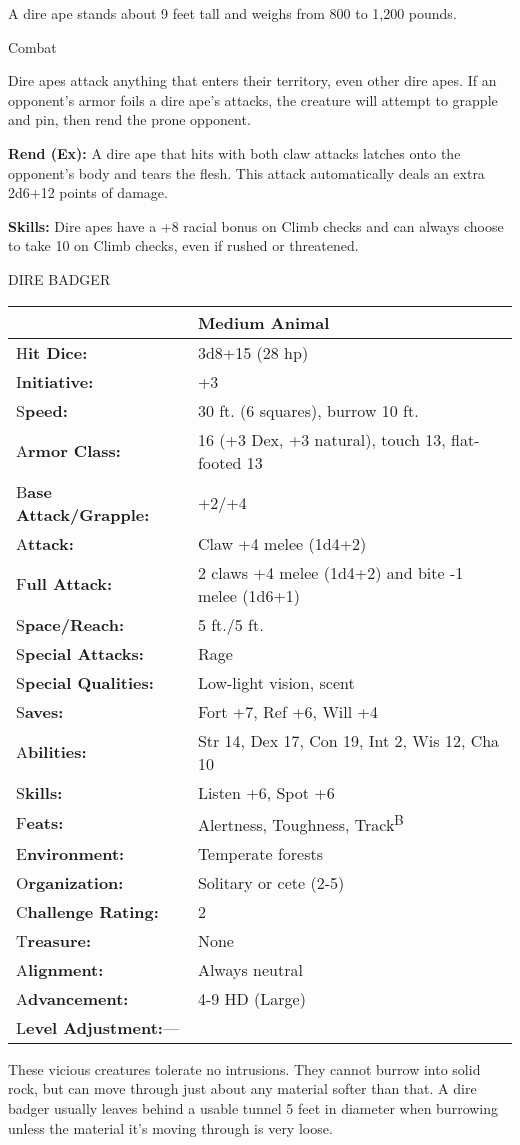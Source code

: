 \documentclass{article}
\begin{document}
A dire ape stands about 9 feet tall and weighs from 800 to 1,200 pounds.

Combat

Dire apes attack anything that enters their territory, even other dire apes. If 
an opponent's armor foils a dire ape's attacks, the creature will attempt to grapple 
and pin, then rend the prone opponent.

\textbf{Rend (Ex):} A dire ape that hits with both claw attacks latches onto the 
opponent's body and tears the flesh. This attack automatically deals an extra 2d6+12 
points of damage.

\textbf{Skills: }Dire apes have a +8 racial bonus on Climb checks and can always 
choose to take 10 on Climb checks, even if rushed or threatened.

\vspace{12pt}
DIRE BADGER

\begin{tabular}{|>{\raggedright}p{91pt}|>{\raggedright}p{211pt}|}
\hline
  & Medium Animal\tabularnewline
\hline
H\textbf{it Dice:} & 3d8+15 (28 hp)\tabularnewline
\hline
I\textbf{nitiative:} & +3\tabularnewline
\hline
S\textbf{peed:} & 30 ft. (6 squares), burrow 10 ft.\tabularnewline
\hline
A\textbf{rmor Class:} & 16 (+3 Dex, +3 natural), touch 13, flat-footed 13\tabularnewline
\hline
B\textbf{ase Attack/Grapple:} & +2/+4\tabularnewline
\hline
A\textbf{ttack:} & Claw +4 melee (1d4+2)\tabularnewline
\hline
F\textbf{ull Attack:} & 2 claws +4 melee (1d4+2) and bite -1 melee (1d6+1)\tabularnewline
\hline
S\textbf{pace/Reach:} & 5 ft./5 ft.\tabularnewline
\hline
S\textbf{pecial Attacks:} & Rage\tabularnewline
\hline
S\textbf{pecial Qualities:} & Low-light vision, scent\tabularnewline
\hline
S\textbf{aves:} & Fort +7, Ref +6, Will +4\tabularnewline
\hline
A\textbf{bilities:} & Str 14, Dex 17, Con 19, Int 2, Wis 12, Cha 10\tabularnewline
\hline
S\textbf{kills:} & Listen +6, Spot +6\tabularnewline
\hline
F\textbf{eats:} & Alertness, Toughness, Track\textsuperscript{B}\tabularnewline
\hline
E\textbf{nvironment:} & Temperate forests\tabularnewline
\hline
O\textbf{rganization:} & Solitary or cete (2-5)\tabularnewline
\hline
C\textbf{hallenge Rating:} & 2\tabularnewline
\hline
T\textbf{reasure:} & None\tabularnewline
\hline
A\textbf{lignment:} & Always neutral\tabularnewline
\hline
A\textbf{dvancement:} & 4-9 HD (Large)\tabularnewline
\hline
L\textbf{evel Adjustment:}--- & \tabularnewline
\hline
\end{tabular}

These vicious creatures tolerate no intrusions. They cannot burrow into solid rock, 
but can move through just about any material softer than that. A dire badger usually 
leaves behind a usable tunnel 5 feet in diameter when burrowing unless the material 
it's moving through is very loose.
\end{document}

